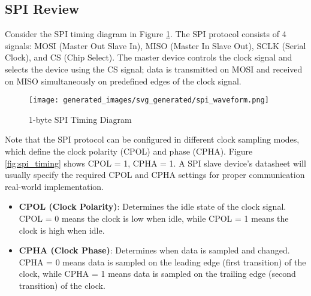 \documentclass[main.tex]{subfiles}
\begin{document}


\subsection{SPI Review}
Consider the SPI timing diagram in Figure \ref{fig:spi_timing_2}. The SPI protocol consists of 4 signals: MOSI (Master Out Slave In), MISO (Master In Slave Out), SCLK (Serial Clock), and CS (Chip Select). The master device controls the clock signal and selects the device using the CS signal; data is transmitted on MOSI and received on MISO simultaneously on predefined edges of the clock signal.

\begin{figure}[H]
    \centering
    \texttt{[image: generated\_images/svg\_generated/spi\_waveform.png]}
    \caption{1-byte SPI Timing Diagram}
    \label{fig:spi_timing_2}
\end{figure}

\noindent Note that the SPI protocol can be configured in different clock sampling modes, which define the clock polarity (CPOL) and phase (CPHA). Figure \ref{fig:spi_timing} shows CPOL = 1, CPHA = 1. A SPI slave device's datasheet will usually specify the required CPOL and CPHA settings for proper communication real-world implementation.
\begin {itemize}
    \item \textbf{CPOL (Clock Polarity)}: Determines the idle state of the clock signal. CPOL = 0 means the clock is low when idle, while CPOL = 1 means the clock is high when idle.
    \item \textbf{CPHA (Clock Phase)}: Determines when data is sampled and changed. CPHA = 0 means data is sampled on the leading edge (first transition) of the clock, while CPHA = 1 means data is sampled on the trailing edge (second transition) of the clock.
\end{itemize}
\end{document}
